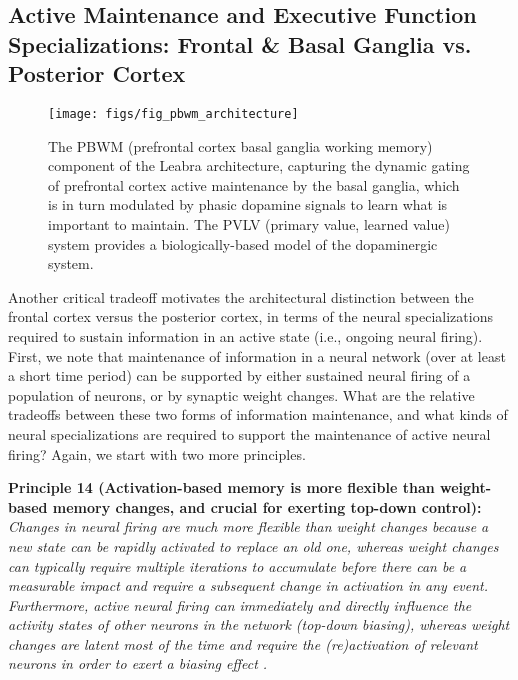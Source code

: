 \documentclass[11pt,twoside]{article}
\begin{document}
\subsection{Active Maintenance and Executive Function Specializations: Frontal \& Basal Ganglia vs. Posterior Cortex}

\begin{figure}
  \centering\texttt{[image: figs/fig\_pbwm\_architecture]}
  \caption{\small The PBWM (prefrontal cortex basal ganglia working
    memory) component of the Leabra architecture, capturing the
    dynamic gating of prefrontal cortex active maintenance by the
    basal ganglia, which is in turn modulated by phasic dopamine
    signals to learn what is important to maintain.  The PVLV (primary
    value, learned value) system provides a biologically-based model
    of the dopaminergic system. }
  \label{fig.pbwm_architecture}
\end{figure}

Another critical tradeoff motivates the architectural distinction
between the frontal cortex versus the posterior cortex, in terms of
the neural specializations required to sustain information in an
active state (i.e., ongoing neural firing).  First, we note that
maintenance of information in a neural network (over at least a short
time period) can be supported by either sustained neural firing of a
population of neurons, or by synaptic weight changes.  What are the
relative tradeoffs between these two forms of information maintenance,
and what kinds of neural specializations are required to support the
maintenance of active neural firing?  Again, we start with two more
principles.

{\bf Principle 14 (Activation-based memory is more flexible than
  weight-based memory changes, and crucial for exerting top-down
  control):} {\em Changes in neural firing are much more flexible than
  weight changes because a new state can be rapidly activated to
  replace an old one, whereas weight changes can typically require
  multiple iterations to accumulate before there can be a measurable
  impact and require a subsequent change in activation in any event.
  Furthermore, active neural firing can immediately and directly
  influence the activity states of other neurons in the network
  (top-down biasing), whereas weight changes are latent most of the
  time and require the (re)activation of relevant neurons in order to
  exert a biasing effect \cite{MunakataLatentActive}.}
\end{document}
